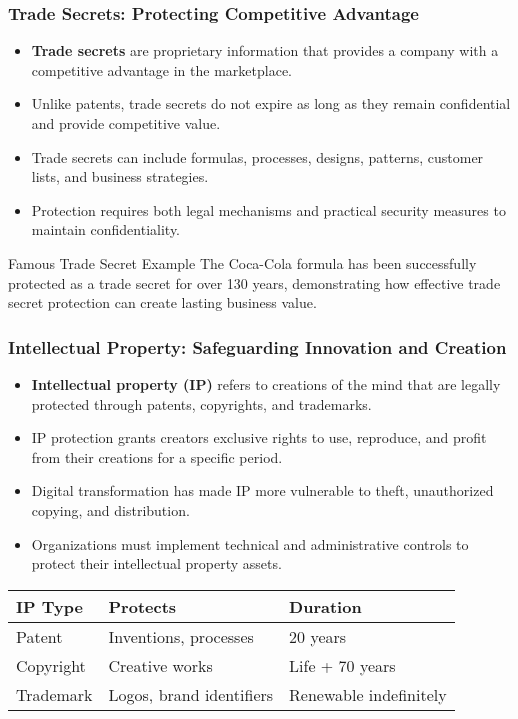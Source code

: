 \documentclass{beamer}
\begin{document}
\begin{frame}
\frametitle{Trade Secrets: Protecting Competitive Advantage}
\begin{itemize}
\item \textbf{Trade secrets} are proprietary information that provides a company with a competitive advantage in the marketplace.
\item Unlike patents, trade secrets do not expire as long as they remain confidential and provide competitive value.
\item Trade secrets can include formulas, processes, designs, patterns, customer lists, and business strategies.
\item Protection requires both legal mechanisms and practical security measures to maintain confidentiality.
\end{itemize}

\begin{exampleblock}{Famous Trade Secret Example}
The Coca-Cola formula has been successfully protected as a trade secret for over 130 years, demonstrating how effective trade secret protection can create lasting business value.
\end{exampleblock}
\end{frame}

\begin{frame}
\frametitle{Intellectual Property: Safeguarding Innovation and Creation}
\begin{itemize}
\item \textbf{Intellectual property (IP)} refers to creations of the mind that are legally protected through patents, copyrights, and trademarks.
\item IP protection grants creators exclusive rights to use, reproduce, and profit from their creations for a specific period.
\item Digital transformation has made IP more vulnerable to theft, unauthorized copying, and distribution.
\item Organizations must implement technical and administrative controls to protect their intellectual property assets.
\end{itemize}

\begin{table}
\begin{tabular}{|l|l|l|}
\hline
\textbf{IP Type} & \textbf{Protects} & \textbf{Duration} \\
\hline
Patent & Inventions, processes & 20 years \\
\hline
Copyright & Creative works & Life + 70 years \\
\hline
Trademark & Logos, brand identifiers & Renewable indefinitely \\
\hline
\end{tabular}
\end{table}
\end{frame}
\end{document}
